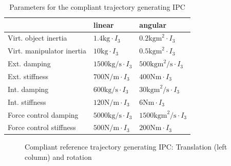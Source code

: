 \documentclass[a4paper,twoside, openright,12pt]{report}
\begin{document}
\begin{table}
	\centering
	\caption[Parameters for the compliant trajectory generating IPC]{Parameters for the compliant trajectory generating IPC}\vspace{10pt}
	\label{TAB:DIPCrParameters}
	
	\begin{tabular}{ l | l | l }
	 & linear & angular \\ \hline
	Virt. object inertia & $1.4 \text{kg} \cdot I_3$ & $0.2 \text{kgm}^2 \cdot I_3$ \\ \hline
	Virt. manipulator inertia & $10 \text{kg} \cdot I_3$ & $0.5 \text{kgm}^2 \cdot I_3$ \\ \hline 
	Ext. damping	 & $1500 \text{kg/s} \cdot I_3$ & $500 \text{kgm}^2 \text{/s} \cdot I_3$ \\ \hline
	Ext. stiffness & $700 \text{N/m} \cdot I_3$ & $400 \text{Nm} \cdot  I_3$ \\ \hline
	Int. damping & $600 \text{kg/s} \cdot I_3$ & $30 \text{kgm}^2 \text{/s} \cdot I_3 $ \\ \hline
	Int. stiffness & $120 \text{N/m} \cdot I_3$ & $6 \text{Nm} \cdot I_3$\\ \hline
	Force control damping & $5000 \text{kg/s} \cdot I_3$ & $1500 \text{kgm}^2 \text{/s} \cdot I_3 $ \\ \hline
	Force control stiffness & $500 \text{N/m} \cdot I_3$ & $200 \text{Nm} \cdot I_3$\\ \hline
\end{tabular}
\end{table}

\begin{figure}

\label{FIG:DIPCrSim}
\caption[Simulation results of the compliant reference trajectory generating IPC]{Compliant reference trajectory generating IPC: Translation (left column) and rotation}
\end{figure}

\clearpage
\end{document}
